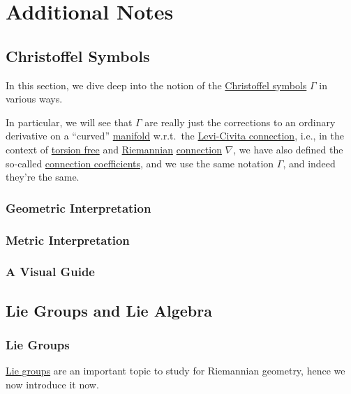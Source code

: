 \chapter{Additional Notes}
\section{Christoffel Symbols}\label{section:Christoffel-symbols}
In this section, we dive deep into the notion of the \hyperref[not:Christoffel-symbol]{Christoffel symbols} \(\Gamma \) in various ways.

In particular, we will see that \(\Gamma \) are really just the corrections to an ordinary derivative on a ``curved'' \hyperref[def:smooth-manifold]{manifold} w.r.t.\ the \hyperref[def:Levi-Civita-connection]{Levi-Civita connection}, i.e., in the context of \hyperref[def:torsion-free]{torsion free} and \hyperref[def:Riemannian]{Riemannian} \hyperref[def:linear-connection]{connection} \(\nabla \), we have also defined the so-called \hyperref[not:connection-coefficient]{connection coefficients}, and we use the same notation \(\Gamma \), and indeed they're the same.

\subsection{Geometric Interpretation}

\subsection{Metric Interpretation}

\subsection{A Visual Guide}

\section{Lie Groups and Lie Algebra}\label{section:Lie-group-and-Lie-algebra}
\subsection{Lie Groups}
\hyperref[def:Lie-group]{Lie groups} are an important topic to study for Riemannian geometry, hence we now introduce it now.

